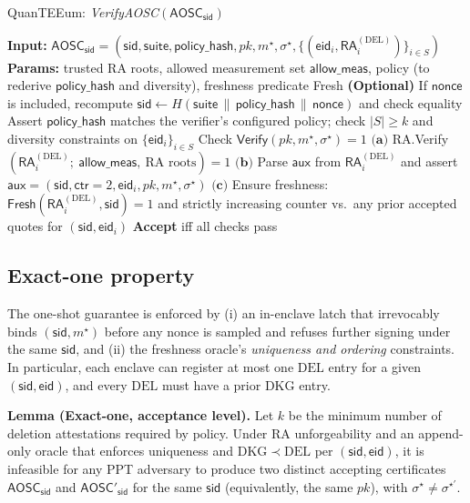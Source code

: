 \documentclass[runningheads,orivec]{llncs}
\newcommand{\prot}{\textsf{QuanTEEum}}
\newcommand{\sid}{\mathsf{sid}}
\begin{document}
\begin{algorithm}[!htbp]
\caption{\prot{}: \emph{VerifyAOSC}$(\mathsf{AOSC}_\sid)$}
\label{alg:verify-aosc}
\begin{small}
\begin{algorithmic}[1]
\State \textbf{Input:} $\mathsf{AOSC}_\sid = (\sid,\mathsf{suite},\mathsf{policy\_hash},pk,m^{\star},\sigma^{\star},\{(\mathsf{eid}_i,\mathsf{RA}^{(\mathrm{DEL})}_i)\}_{i\in S})$
\State \textbf{Params:} trusted RA roots, allowed measurement set $\textsf{allow\_meas}$, policy (to rederive $\mathsf{policy\_hash}$ and diversity), freshness predicate \textsf{Fresh}
\State \textbf{(Optional)} If $\mathsf{nonce}$ is included, recompute $\sid \gets H(\mathsf{suite}\,\|\,\mathsf{policy\_hash}\,\|\,\mathsf{nonce})$ and check equality
\State Assert $\mathsf{policy\_hash}$ matches the verifier’s configured policy; check $|S|\ge k$ and diversity constraints on $\{\mathsf{eid}_i\}_{i\in S}$
\State Check $\mathsf{Verify}(pk,m^{\star},\sigma^{\star})=1$
  \State $\textbf{(a)}$ \textsf{RA.Verify}$(\mathsf{RA}^{(\mathrm{DEL})}_i;\ \textsf{allow\_meas},\ \text{RA roots})=1$
  \State $\textbf{(b)}$ Parse $\mathsf{aux}$ from $\mathsf{RA}^{(\mathrm{DEL})}_i$ and assert $\mathsf{aux}=(\sid,\mathsf{ctr}{=}2,\mathsf{eid}_i,pk,m^{\star},\sigma^{\star})$
  \State $\textbf{(c)}$ Ensure freshness: $\textsf{Fresh}(\mathsf{RA}^{(\mathrm{DEL})}_i,\sid)=1$ and strictly increasing counter vs.\ any prior accepted quotes for $(\sid,\mathsf{eid}_i)$
\EndFor
\State \textbf{Accept} iff all checks pass
\end{algorithmic}
\end{small}
\end{algorithm}

\subsection{Exact-one property}
The one-shot guarantee is enforced by (i) an in-enclave latch that irrevocably binds $(\sid,m^{\star})$ before any nonce is sampled and refuses further signing under the same $\sid$, and (ii) the freshness oracle’s \emph{uniqueness and ordering} constraints. In particular, each enclave can register at most one $\mathrm{DEL}$ entry for a given $(\sid,\mathsf{eid})$, and every $\mathrm{DEL}$ must have a prior $\mathrm{DKG}$ entry.

\noindent\textbf{Lemma (Exact-one, acceptance level).}
Let $k$ be the minimum number of deletion attestations required by policy. Under RA unforgeability and an append-only oracle that enforces uniqueness and $\mathrm{DKG}\!\prec\!\mathrm{DEL}$ per $(\sid,\mathsf{eid})$, it is infeasible for any PPT adversary to produce two distinct accepting certificates
$\mathsf{AOSC}_\sid$ and $\mathsf{AOSC}'_\sid$ for the same $\sid$ (equivalently, the same $pk$), with $\sigma^{\star}\neq\sigma^{\star'}$.
\end{document}
